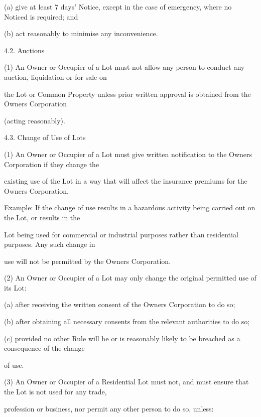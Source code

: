 \documentclass{article}
\begin{document}
{\fontsize{9.962}{1}(a) give at least 7 days’ Notice, except in the case of emergency, where no Noticed is required; and }

{\fontsize{9.962}{1}(b) act reasonably to minimise any inconvenience. }

{\fontsize{9.99}{1}4.2. Auctions }

{\fontsize{9.962}{1}(1) An Owner or Occupier of a Lot must not allow any person to conduct any auction, liquidation or for sale on }

{\fontsize{10.02}{1}the Lot or Common Property unless prior written approval is obtained from the Owners Corporation }

{\fontsize{10.02}{1}(acting reasonably). }

{\fontsize{9.99}{1}4.3. Change of Use of Lots }

{\fontsize{9.962}{1}(1) An Owner or Occupier of a Lot must give written notification to the Owners Corporation if they change the }

{\fontsize{10.02}{1}existing use of the Lot in a way that will affect the insurance premiums for the Owners Corporation. }

{\fontsize{10.02}{1}Example: If the change of use results in a hazardous activity being carried out on the Lot, or results in the }

{\fontsize{10.02}{1}Lot being used for commercial or industrial purposes rather than residential purposes. Any such change in }

{\fontsize{10.02}{1}use will not be permitted by the Owners Corporation. }

{\fontsize{9.962}{1}(2) An Owner or Occupier of a Lot may only change the original permitted use of its Lot: }

{\fontsize{9.962}{1}(a) after receiving the written consent of the Owners Corporation to do so; }

{\fontsize{9.962}{1}(b) after obtaining all necessary consents from the relevant authorities to do so; }

{\fontsize{9.962}{1}(c) provided no other Rule will be or is reasonably likely to be breached as a consequence of the change }

{\fontsize{10.02}{1}of use. }

{\fontsize{9.962}{1}(3) An Owner or Occupier of a Residential Lot must not, and must ensure that the Lot is not used for any trade, }

{\fontsize{10.02}{1}profession or business, nor permit any other person to do so, unless: }
\end{document}
